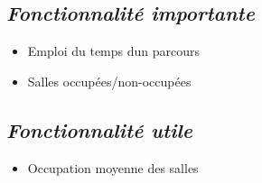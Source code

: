 \documentclass{article}
\begin{document}
\subsection{\textit{Fonctionnalit\'e importante}}
\begin{itemize}
\item Emploi du temps d\textquotesingle un parcours
\item Salles occup\'ees/non-occup\'ees
\end{itemize}
\subsection{\textit{Fonctionnalit\'e utile}}
\begin{itemize}
\item Occupation moyenne des salles
\end{itemize}
\end{document}
